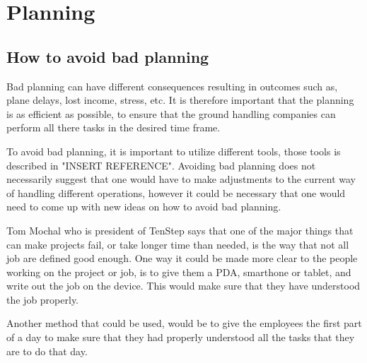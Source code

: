 \chapter{Planning}
\section{How to avoid bad planning}

Bad planning can have different consequences resulting in outcomes such as, plane delays, lost income, stress, etc. It is therefore important that the planning is as efficient as possible, to ensure that the ground handling companies can perform all there tasks in the desired time frame.

To avoid bad planning, it is important to utilize different tools, those  tools is described in "INSERT REFERENCE". Avoiding bad planning does not necessarily suggest that one would have to make adjustments to the current way of handling different operations, however it could be necessary that one would need to come up with new ideas on how to avoid bad planning.

Tom Mochal who is president of TenStep \cite{AvoidP_TenStep} says that one of the major things that can make projects fail, or take longer time than needed, is the way that not all job are defined good enough\cite{AvoidP_PoorP}. One way it could be made more clear to the people working on the project or job, is to give them a PDA, smarthone or tablet, and write out the job on the device. This would make sure that they have understood the job properly.


Another method that could be used, would be to give the employees the first part of a day to make sure that they had properly understood all the tasks that they are to do that day.